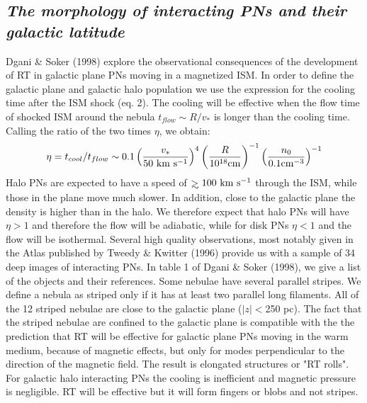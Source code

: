 \subsection{\it The morphology of interacting PNs and their galactic latitude}
Dgani \& Soker (1998) explore the observational consequences of the development
of RT in galactic plane PNs moving in a magnetized ISM.
In order to define the galactic plane and galactic halo population we
use the expression for the cooling time after the ISM shock (eq. 2).
The cooling will be effective when the flow time of shocked ISM around
the nebula $t_{flow}\sim  R/v_*$ is longer than the cooling time.
Calling the ratio of the two times $\eta$, we obtain:
\begin{eqnarray}
\eta=t_{cool}/t_{flow} \sim 0.1
\left( {{v_\ast}\over{50 ~\rm{km}~\rm{s}^{-1}}} \right)^4
\left( {{R}\over{10^{18} \rm{cm}}} \right) ^{-1}
\left( {{n_0}\over{0.1 \rm{cm}^{-3}}} \right) ^{-1}
\end{eqnarray}
Halo PNs are expected to have a speed of $\gae 100 \km \s^{-1}$ through
the ISM, while those in the plane move much slower.
In addition, close to the galactic plane the density is higher
than in the halo.
We therefore expect that halo PNs will have $\eta > 1$ and therefore
the flow will be adiabatic, while for disk PNs
$\eta < 1$ and the flow will be isothermal.
Several high quality observations,
most notably given in the Atlas published by Tweedy \& Kwitter (1996)
provide us with a sample of 34  deep  images of interacting PNs.
In table 1 of Dgani \& Soker (1998),
we give a list of the objects and their references.
Some nebulae
have several parallel stripes.
We define a nebula as striped only
if it has at least two parallel long filaments.
All of the 12 striped nebulae  are close to the galactic plane ($|z|<$250 pc).
The fact that  the striped nebulae are confined to the galactic plane
is compatible with the the  prediction
that RT will be effective for
galactic plane PNs moving in the warm medium, because of
magnetic effects, but only for modes perpendicular
to the direction of the magnetic field.
The result is elongated structures or  "RT rolls".
For galactic  halo interacting PNs the cooling is
inefficient and magnetic pressure is negligible.
RT will be effective but it will form fingers or blobs and not stripes.

